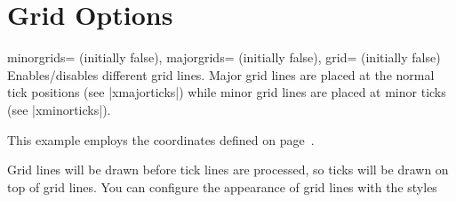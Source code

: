 
\section[reference.gridoptions-axiscoordinates]{Grid Options}

\begin{pgfplotsxykeylist}{%
    \x minorgrids= (initially false),
    \x majorgrids= (initially false),
    grid= (initially false)%
}
    Enables/disables different grid lines. Major grid lines are placed at the
    normal tick positions (see |xmajorticks|) while minor grid lines are placed
    at minor ticks (see |xminorticks|).

    This example employs the coordinates defined on
    page~\pageref{page:plotcoords:src}.
\begin{codeexample}[]
\begin{tikzpicture}
\begin{loglogaxis}[
    xlabel={\textsc{Dof}},
    ylabel={$L_2$ Error},
    grid=major,
]
    \plotcoords
\end{loglogaxis}
\end{tikzpicture}
\end{codeexample}

\begin{codeexample}[]
\end{codeexample}

    Grid lines will be drawn before tick lines are processed, so ticks will be
    drawn on top of grid lines. You can configure the appearance of grid lines
    with the styles
\begin{codeexample}
\end{codeexample}
\end{pgfplotsxykeylist}


